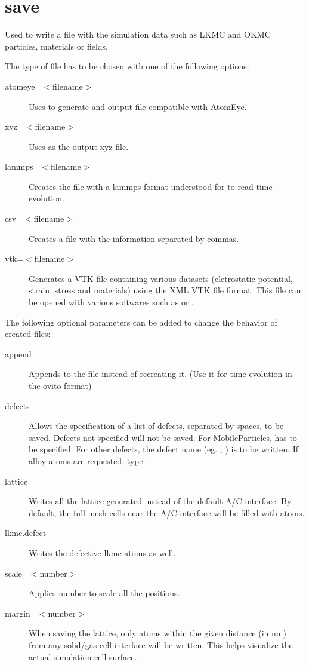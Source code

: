 \section{save}
\label{sec:save}

Used to write a file with the simulation data such as LKMC and OKMC particles, materials or fields.

The type of file has to be chosen with one of the following options:

\begin{description}
\item [atomeye=$<$filename$>$] Uses  to generate and output file compatible with AtomEye.
\item [xyz=$<$filename$>$] Uses  as the output xyz file.
\item [lammps=$<$filename$>$] Creates the file with a lammps format understood for  to read time evolution.
\item [csv=$<$filename$>$] Creates a file with the information separated by commas.
\item [vtk=$<$filename$>$] Generates a VTK file containing various datasets (eletrostatic potential, strain, stress and materials) using the XML VTK file format. This file can be opened with various softwares such as  or .
\end{description}

The following optional parameters can be added to change the behavior of created files:

\begin{description}
\item [append] Appends to the file instead of recreating it. (Use it for time evolution in the ovito format)
\item [defects] Allows the specification of a list of defects, separated by spaces, to be saved. Defects not specified will not be saved. For MobileParticles,  has to be specified. For other defects, the defect name (eg. , ) is to be written. If alloy atoms are requested, type .
\item [lattice] Writes all the lattice generated instead of the default A/C interface. By default, the full mesh cells near the A/C interface will be filled with atoms.
\item [lkmc.defect] Writes the defective lkmc atoms as well.
\item [scale=$<$number$>$] Applies number to scale all the positions.
\item [margin=$<$number$>$] When saving the lattice, only atoms within the given distance (in \si{\nm}) from any solid/gas cell interface will be written. This helps visualize the actual simulation cell surface.
\end{description}

